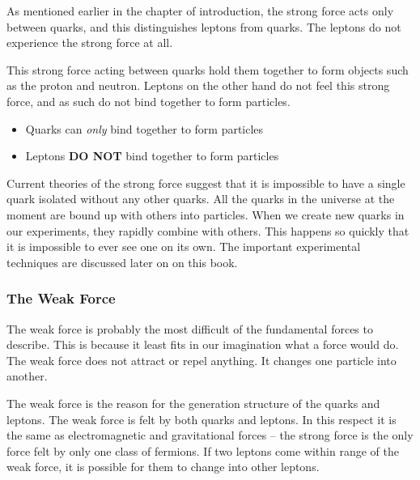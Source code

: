 As mentioned earlier in the chapter of introduction, the strong force acts only between quarks, and this distinguishes leptons from quarks. The leptons do not experience the strong force at all.

This strong force acting between quarks hold them together to form objects such as the proton and neutron. Leptons on the other hand do not feel this strong force, and as such do not bind together to form particles.
\begin{itemize}
  \item Quarks can \emph{only }bind together to form particles
  \item Leptons \textbf{DO NOT} bind together to form particles
\end{itemize}

Current theories of the strong force suggest that it is impossible to have a single quark isolated without any other quarks. All the quarks in the universe at the moment are bound up with others into particles. When we create new quarks in our experiments, they rapidly combine with others. This happens so quickly that it is impossible to ever see one on its own. The important experimental techniques are discussed later on on this book.

\subsubsection{The Weak Force}
The weak force is probably the most difficult of the fundamental forces to describe. This is because it least fits in our imagination what a force would do. The weak force does not attract or repel anything. It changes one particle into another. 

The weak force is the reason for the generation structure of the quarks and leptons. The weak force is felt by both quarks and leptons. In this respect it is the same as electromagnetic and gravitational forces -- the strong force is the only force felt by only one class of fermions. If two leptons come within range of the weak force, it is possible for them to change into other leptons. 

\begin{figure}[h]
\end{figure}

